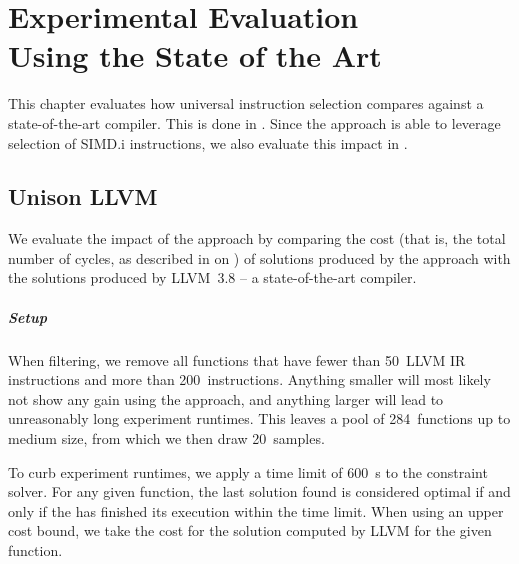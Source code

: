%

\chapter[Experimental Evaluation Using the State of the Art]%
        {Experimental Evaluation\\ Using the State of the Art}

This chapter evaluates how \gls{universal instruction selection} compares
against a state-of-the-art \gls{compiler}.
%
This is done in .
%
Since the approach is able to leverage selection of \gls{SIMD.i}
\glspl{instruction}, we also evaluate this impact in
.


\section{Unison \versus LLVM}

We evaluate the impact of the approach by comparing the cost (that is, the total
number of cycles, as described in  on
) of \glspl{solution} produced by the
approach with the \glspl{solution} produced by \mbox{\gls{LLVM} 3.8} -- a
state-of-the-art \gls{compiler}.


\paragraph{Setup}

When filtering, we remove all \glspl{function} that have fewer than
\num{50}~\gls{LLVM} \gls{IR} \glspl{instruction} and more than
\num{200}~\glspl{instruction}.
%
Anything smaller will most likely not show any gain using the approach, and
anything larger will lead to unreasonably long experiment runtimes.
%
This leaves a pool of \num{284}~\glspl{function} up to medium size, from which
we then draw \num{20}~samples.

To curb experiment runtimes, we apply a time limit of \SI{600}{\s} to the
\gls{constraint solver}.
%
For any given \gls{function}, the last \gls{solution} found is considered
optimal if and only if the  has finished its
execution within the time limit.
%
When using an upper cost bound, we take the cost for the \gls{solution} computed
by \gls{LLVM} for the given \gls{function}.


